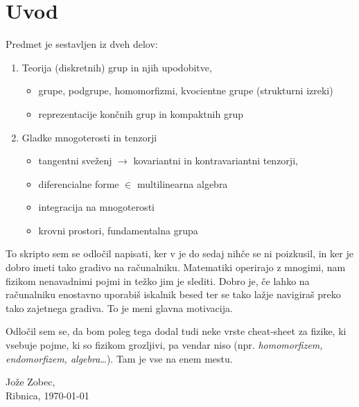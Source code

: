 \chapter*{Uvod}

Predmet je sestavljen iz dveh delov:
\begin{enumerate}
	\item{Teorija (diskretnih) grup in njih upodobitve,}
		\begin{itemize}
			\item{grupe, podgrupe, homomorfizmi, kvocientne grupe (strukturni izreki)}
			\item{reprezentacije kon\v cnih grup in kompaktnih grup}
		\end{itemize}
	\item{Gladke mnogoterosti in tenzorji}
		\begin{itemize}
			\item{tangentni sve\v zenj $\to$ kovariantni in kontravariantni tenzorji,}
			\item{diferencialne forme $\in$ multilinearna algebra}
			\item{integracija na mnogoterosti}
			\item{krovni prostori, fundamentalna grupa}
		\end{itemize}
\end{enumerate}

To skripto sem se odlo\v cil napisati, ker v je do sedaj nih\v ce se ni poizkusil, in ker je dobro
imeti tako gradivo na ra\v cunalniku. Matematiki operirajo z mnogimi, nam fizikom nenavadnimi
pojmi in te\v zko jim je slediti. Dobro je, \v ce lahko na ra\v cunalniku enostavno uporabi\v s
iskalnik besed ter se tako la\v zje navigira\v s preko tako zajetnega gradiva. To je meni glavna
motivacija.

Odlo\v cil sem se, da bom poleg tega dodal tudi neke vrste cheat-sheet za fizike, ki vsebuje pojme,
ki so fizikom grozljivi, pa vendar niso (npr. \emph{homomorfizem, endomorfizem, algebra\ldots}). Tam
je vse na enem mestu.

\begin{flushright}
Jo\v ze Zobec,\\[0.5cm]
Ribnica, \today
\end{flushright}
